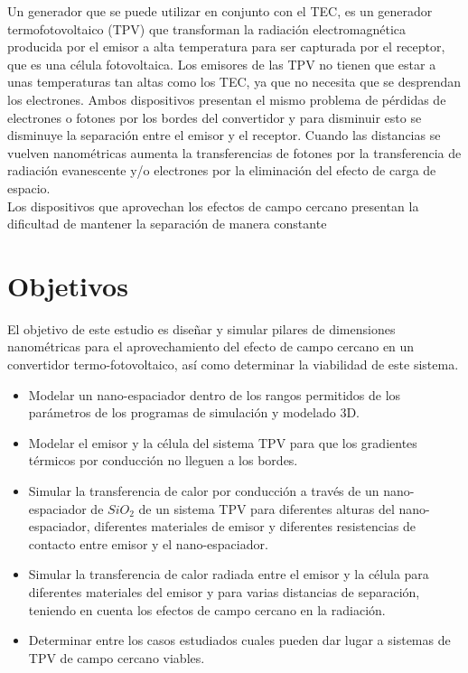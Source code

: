 Un generador que se puede utilizar en conjunto con el TEC, es un generador termofotovoltaico (TPV) que transforman la radiación electromagnética producida por el emisor a alta temperatura para ser capturada por el receptor, que es una célula fotovoltaica. Los emisores de las TPV no tienen que estar a unas temperaturas tan altas como los TEC, ya que no necesita que se desprendan los electrones. Ambos dispositivos presentan el mismo problema de pérdidas de electrones o fotones por los bordes del convertidor y para disminuir esto se disminuye la separación entre el emisor y el receptor. Cuando las distancias se vuelven nanométricas aumenta la transferencias de fotones por la transferencia de radiación evanescente y/o electrones por la eliminación del efecto de carga de espacio.\\

Los dispositivos que aprovechan los efectos de campo cercano presentan la dificultad de mantener la separación de manera constante


\section{Objetivos}
El objetivo de este estudio es diseñar y simular pilares de dimensiones nanométricas para el aprovechamiento del efecto de campo cercano en un convertidor termo-fotovoltaico, así como determinar la viabilidad de este sistema. 
\begin{itemize}
	\item Modelar un nano-espaciador dentro de los rangos permitidos de los parámetros de los programas de simulación y modelado 3D.
	\item Modelar el emisor y la célula del sistema TPV para que los gradientes térmicos por conducción no lleguen a los bordes.
	\item Simular la transferencia de calor por conducción a través de un nano-espaciador de $SiO_2$ de un sistema TPV para diferentes alturas del nano-espaciador, diferentes materiales de emisor y diferentes resistencias de contacto entre emisor y el nano-espaciador.
	\item Simular la transferencia de calor radiada entre el emisor y la célula para diferentes materiales del emisor y para varias distancias de separación, teniendo en cuenta los efectos de campo cercano en la radiación.
	\item Determinar entre los casos estudiados cuales pueden dar lugar a sistemas de TPV de campo cercano viables.
\end{itemize}


